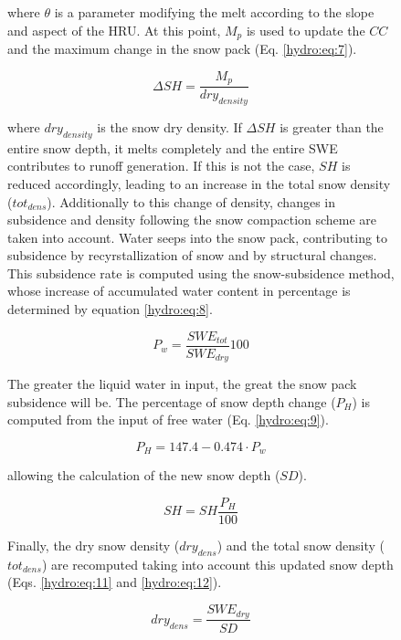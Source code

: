 \begin{figure}[h]
where $\theta$ is a parameter modifying the melt according to the slope and aspect of the HRU. At this point, $M_{p}$ is used to update the $CC$ and the maximum change in the snow pack (Eq. \ref{hydro:eq:7}).

\begin{equation} \label{hydro:eq:7}
 \Delta SH = \frac{M_{p}}{dry_{density}}
\end{equation} 

where $dry_{density}$ is the snow dry density. If $\Delta SH$ is greater than the entire snow depth, it melts completely and the entire SWE contributes to runoff generation. If this is not the case, $SH$ is reduced accordingly, leading to an increase in the total snow density ($tot_{dens}$). Additionally to this change of density, changes in subsidence and density following the snow compaction scheme \citep{bertle_effect_1966} are taken into account. Water seeps into the snow pack, contributing to subsidence by recyrstallization of snow and by structural changes. This subsidence rate is computed using the snow-subsidence method, whose increase of accumulated water content in percentage is determined by equation \ref{hydro:eq:8}.

\begin{equation} \label{hydro:eq:8}
 P_{w} = \frac{SWE_{tot}}{SWE_{dry}}100
\end{equation} 

The greater the liquid water in input, the great the snow pack subsidence will be. The percentage of snow depth change ($P_{H}$) is computed from the input of free water (Eq. \ref{hydro:eq:9}).

\begin{equation} \label{hydro:eq:9}
 P_{H} = 147.4 - 0.474 \cdot P_{w}
\end{equation} 

allowing the calculation of the new snow depth ($SD$).

\begin{equation} \label{hydro:eq:10}
SH = SH\frac{P_{H}}{100}
\end{equation} 

Finally, the dry snow density ($dry_{dens}$) and the total snow density ($tot_{dens}$) are recomputed taking into account this updated snow depth (Eqs. \ref{hydro:eq:11} and \ref{hydro:eq:12}). 

\begin{equation} \label{hydro:eq:11}
dry_{dens} = \frac{SWE_{dry}}{SD}
\end{equation} 


\end{figure}
